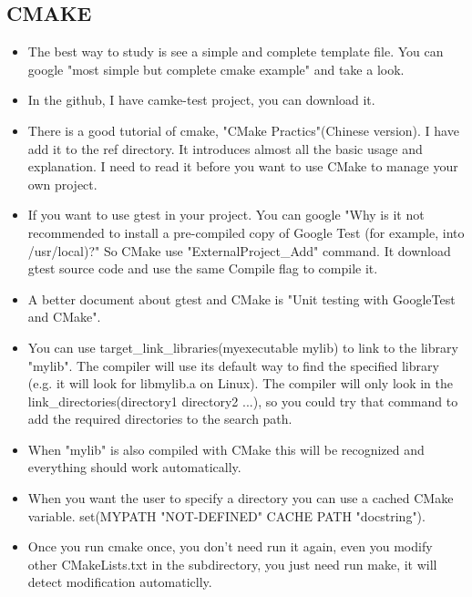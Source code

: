 \documentclass[a4paper,11pt,twoside]{book}
\begin{document}
\subsection{CMAKE}
\begin{itemize}
		\item The best way to study is see a simple and complete template file. You can google "most simple but complete cmake example" and take a look.  
		
		\item In the github, I have camke-test project, you can download it.
		
		\item There is a good tutorial of cmake, "CMake Practics"(Chinese version). I have add it to the ref directory. It introduces almost all the basic usage and explanation. I need to read it before you want to use CMake to manage your own project.
		\item If you want to use gtest in your project. You can google "Why is it not recommended to install a pre-compiled copy of Google Test (for example, into /usr/local)?" So CMake use "ExternalProject\_Add" command. It download gtest source code and use the same Compile flag to compile it. 
		
		\item A better document about gtest and CMake is "Unit testing with GoogleTest and CMake". 
		
		\item You can use target\_link\_libraries(myexecutable mylib) to link to the library "mylib". The compiler will use its default way to find the specified library (e.g. it will look for libmylib.a on Linux). The compiler will only look in the link\_directories(directory1 directory2 ...), so you could try that command to add the required directories to the search path.

\item When "mylib" is also compiled with CMake this will be recognized and everything should work automatically.

\item When you want the user to specify a directory you can use a cached CMake variable. set(MYPATH "NOT-DEFINED" CACHE PATH "docstring").

\item Once you run cmake once, you don't need run it again, even you modify other CMakeLists.txt in the subdirectory, you just need run make, it will detect modification automaticlly. 
\end{itemize}
\end{document}
